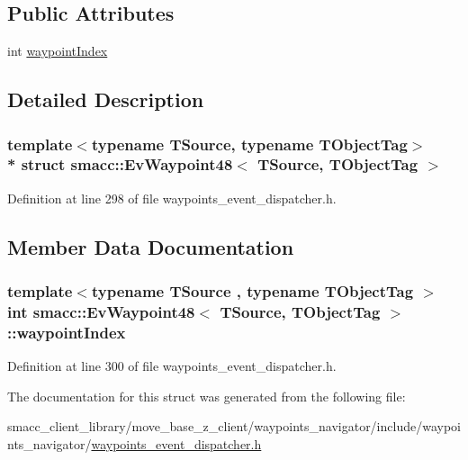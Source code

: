 \subsection*{Public Attributes}
\begin{DoxyCompactItemize}
\item 
int \hyperlink{structsmacc_1_1EvWaypoint48_a8b227d657760858d5976bafa7e75977c}{waypoint\+Index}
\end{DoxyCompactItemize}


\subsection{Detailed Description}
\subsubsection*{template$<$typename T\+Source, typename T\+Object\+Tag$>$\\*
struct smacc\+::\+Ev\+Waypoint48$<$ T\+Source, T\+Object\+Tag $>$}



Definition at line 298 of file waypoints\+\_\+event\+\_\+dispatcher.\+h.



\subsection{Member Data Documentation}
\subsubsection[{\texorpdfstring{waypoint\+Index}{waypointIndex}}]{\setlength{\rightskip}{0pt plus 5cm}template$<$typename T\+Source , typename T\+Object\+Tag $>$ int {\bf smacc\+::\+Ev\+Waypoint48}$<$ T\+Source, T\+Object\+Tag $>$\+::waypoint\+Index}\hypertarget{structsmacc_1_1EvWaypoint48_a8b227d657760858d5976bafa7e75977c}{}\label{structsmacc_1_1EvWaypoint48_a8b227d657760858d5976bafa7e75977c}


Definition at line 300 of file waypoints\+\_\+event\+\_\+dispatcher.\+h.



The documentation for this struct was generated from the following file\+:\begin{DoxyCompactItemize}
\item 
smacc\+\_\+client\+\_\+library/move\+\_\+base\+\_\+z\+\_\+client/waypoints\+\_\+navigator/include/waypoints\+\_\+navigator/\hyperlink{waypoints__event__dispatcher_8h}{waypoints\+\_\+event\+\_\+dispatcher.\+h}\end{DoxyCompactItemize}
